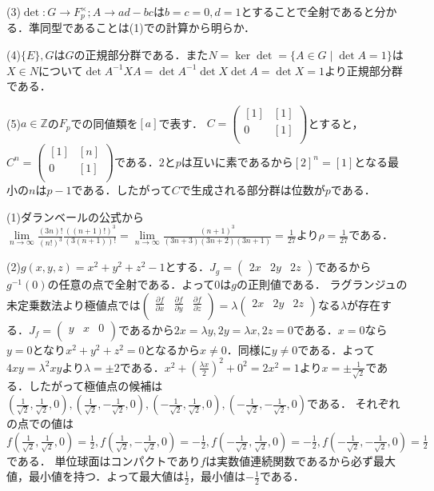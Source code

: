 \documentclass[
		book,
		head_space=20mm,
		foot_space=20mm,
		gutter=10mm,
		line_length=190mm
]{jlreq}
\begin{document}
    (3)$\det \colon G \rightarrow F_p^{\times};A \rightarrow ad-bc$は$b=c=0,d=1$とすることで全射であると分かる．準同型であることは(1)での計算から明らか．

    (4)$\{ E\},G$は$G$の正規部分群である．また$N=\ker \det =\{ A \in G \mid \det A =1 \}$は$X \in N$について$\det A^{-1}XA=\det A^{-1}\det X \det A=\det X=1$より正規部分群である．

    (5)$a \in \mathbb{Z}$の$F_p$での同値類を$[a]$で表す．
    $C=\begin{pmatrix}
        [1] & [1] \\
        0 & [1] \\
    \end{pmatrix}$とすると，$C^n=\begin{pmatrix}
        [1] & [n] \\
        0 & [1] \\
        \end{pmatrix}$である．$2$と$p$は互いに素であるから$[2]^n =[1]$となる最小の$n$は$p-1$である．したがって$C$で生成される部分群は位数が$p$である．


    (1)ダランベールの公式から$\lim\limits_{n \to \infty} \frac{(3n)!}{(n!)^3} \frac{((n+1)!)^3}{(3(n+1))!}=\lim\limits_{n \to \infty} \frac{(n+1)^3}{(3n+3)(3n+2)(3n+1)}=\frac{1}{27}$より$\rho=\frac{1}{27}$である．

    (2)$g(x,y,z)=x^2+y^2+z^2-1$とする．$J_g=\begin{pmatrix}
        2x & 2y & 2z 
        \end{pmatrix}$であるから$g^{-1}(0)$の任意の点で全射である．よって$0$は$g$の正則値である．
        ラグランジュの未定乗数法より極値点では$\begin{pmatrix}
            \frac{\partial f}{\partial x} & \frac{\partial f}{\partial y} & \frac{\partial f}{\partial z} \\
        \end{pmatrix}=\lambda \begin{pmatrix}
            2x & 2y & 2z \\
            \end{pmatrix}$なる$\lambda$が存在する．$J_f=\begin{pmatrix}
                y & x & 0 \\
            \end{pmatrix}$であるから$2x=\lambda y,2y=\lambda x,2z=0$である．$x=0$なら$y=0$となり$x^2+y^2+z^2=0$となるから$x \neq 0$．同様に$y\neq 0$である．よって$4xy=\lambda^2xy$より$\lambda=\pm 2$である．$x^2+(\frac{\lambda x}{2})^2+0^2=2x^2=1$より$x=\pm \frac{1}{\sqrt{2}}$である．したがって極値点の候補は
            $(\frac{1}{\sqrt{2}},\frac{1}{\sqrt{2}},0),(\frac{1}{\sqrt{2}},-\frac{1}{\sqrt{2}},0),(-\frac{1}{\sqrt{2}},\frac{1}{\sqrt{2}},0),(-\frac{1}{\sqrt{2}},-\frac{1}{\sqrt{2}},0)$である．
            それぞれの点での値は
            $f(\frac{1}{\sqrt{2}},\frac{1}{\sqrt{2}},0)=\frac{1}{2},f(\frac{1}{\sqrt{2}},-\frac{1}{\sqrt{2}},0)=-\frac{1}{2},f(-\frac{1}{\sqrt{2}},\frac{1}{\sqrt{2}},0)=-\frac{1}{2},f(-\frac{1}{\sqrt{2}},-\frac{1}{\sqrt{2}},0)=\frac{1}{2}$である．
            単位球面はコンパクトであり$f$は実数値連続関数であるから必ず最大値，最小値を持つ．よって最大値は$\frac{1}{2}$，最小値は$-\frac{1}{2}$である．
\end{document}
